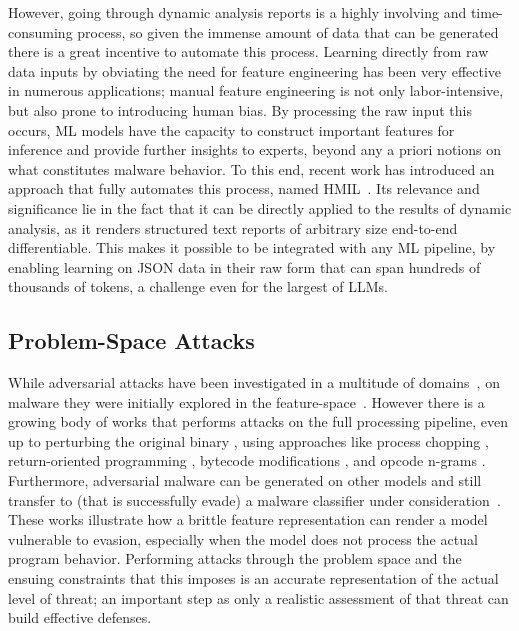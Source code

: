 However, going through dynamic analysis reports is a highly involving and time-consuming process, so given the immense amount of data that can be generated there is a great incentive to automate this process.
Learning directly from raw data inputs by obviating the need for feature engineering has been very effective in numerous applications; manual feature engineering is not only labor-intensive, but also prone to introducing human bias.
By processing the raw input this occurs, ML models have the capacity to construct important features for inference and provide further insights to experts, beyond any a priori notions on what constitutes malware behavior.
To this end, recent work has introduced an approach that fully automates this process, named \gls{HMIL}~\cite{mandlik2022jsongrinder,pevny2017using}.
Its relevance and significance lie in the fact that it can be directly applied to the results of dynamic analysis, as it renders structured text reports of arbitrary size end-to-end differentiable.
This makes it possible to be integrated with any ML pipeline, by enabling learning on JSON data in their raw form that can span hundreds of thousands of tokens, a challenge even for the largest of LLMs.

\subsection{Problem-Space Attacks}
While adversarial attacks have been investigated in a multitude of domains~\cite{biggio2018wild}, on malware they were initially explored in the feature-space~\cite{grosse2017adversarial, hu2017generating, stokes2018attack}.
However there is a growing body of works that performs attacks on the full processing pipeline, even up to perturbing the original binary \cite{anderson2018learning, pierazzi2020intriguing, labaca2021realizable, tsingenopoulos2022adaptive,  galloro2022systematical, park2020survey}, using approaches like process chopping \cite{ispoglou2016malwash}, return-oriented programming \cite{ntantogian2019transforming}, bytecode modifications \cite{burr2021improving}, and opcode n-grams \cite{li2020adversarial}.
Furthermore, adversarial malware can be generated on other models and still transfer to (that is successfully evade) a malware classifier under consideration~\cite{demontis2019adversarial}.
These works illustrate how a brittle feature representation can render a model vulnerable to evasion, especially when the model does not process the actual program behavior.
Performing attacks through the problem space and the ensuing constraints that this imposes is an accurate representation of the actual level of threat; an important step as only a realistic assessment of that threat can build effective defenses.


